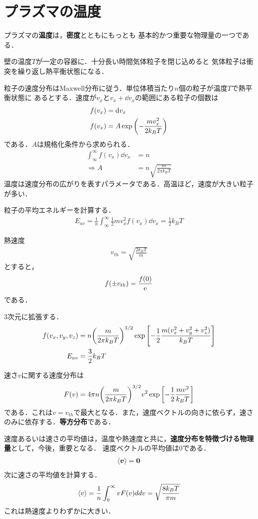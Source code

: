\documentclass{report}
\begin{document}
\section{プラズマの温度}
プラズマの\textbf{温度}は，\textbf{密度}とともにもっとも
基本的かつ重要な物理量の一つである．

壁の温度$T$が一定の容器に．十分長い時間気体粒子を閉じ込めると
気体粒子は衝突を繰り返し熱平衡状態になる．

粒子の速度分布はMaxwell分布に従う．単位体積当たり$n$個の粒子が温度$T$で熱平衡状態に
あるとする．速度が$v_x$と$v_x + \dd{v_x}$の範囲にある粒子の個数は
\begin{align}
  f(v_x) &= \dd{v_x}\\
  f(v_x) &= A \exp\qty(-\frac{mv_x^2}{2k_B T})
\end{align}
である．$A$は規格化条件から求められる．
\begin{align}
  \int_{\infty}^{\infty} f(v_x) \dd{v_x} &= n\\
  \Rightarrow A &= n\sqrt{\frac{m}{2\pi k_B T}}
\end{align}
温度は速度分布の広がりを表すパラメータである．高温ほど，速度が大きい粒子が多い．

粒子の平均エネルギーを計算する．
\begin{align}
  E_{av} = \frac{1}{n}\int_{\infty}^{\infty} \frac{1}{2}mv_x^2f(v_x) \dd{v_x} = \frac{1}{2}k_B T
\end{align}

熱速度
\begin{align}
  v_{th} = \sqrt{\frac{2k_B T}{m}}
\end{align}
とすると，
\begin{align}
  f(\pm v_{th}) = \frac{f(0)}{\mathrm{e}}
\end{align}
である．

3次元に拡張する．
\begin{align}
  f(v_x,v_y,v_z) &= n\qty(\frac{m}{2\pi k_B T})^{3/2} \exp\qty[-\frac{1}{2}\frac{m(v_x^2 + v_y^2 + v_z^2)}{k_B T}]\\
  E_{av} &= \frac{3}{2}k_B T
\end{align}

速さ$v$に関する速度分布は
\begin{align}
  F(v) = 4\pi n \qty(\frac{m}{2\pi k_B T})^{3/2} v^2 \exp\qty[-\frac{1}{2}\frac{mv^2}{k_B T}]
\end{align}
である．これは$v=v_{th}$で最大となる．また，速度ベクトルの向きに依らず，速さのみに依存する．\textbf{等方分布}である．

速度あるいは速さの平均値は，温度や熱速度と共に，\textbf{速度分布を特徴づける物理量}として，今後，重要となる．
速度ベクトルの平均値は0である．
\begin{align}
  \ev{\bm{v}} = \bm{0}
\end{align}
次に速さの平均値を計算する．
\begin{align}
  \ev{v} = \frac{1}{n}\int_{0}^{\infty} v F(v) dd{v} = \sqrt{\frac{8 k_B T}{\pi m}}
\end{align}
これは熱速度よりわずかに大きい．
\end{document}
